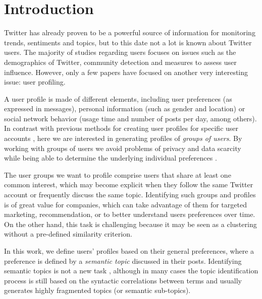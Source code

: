 \section{Introduction}

Twitter has already proven to be a powerful source of information for  monitoring
trends, sentiments and topics, 
but to
this date not a lot is known about Twitter users.  The majority of studies
regarding users focuses on issues such as the demographics of Twitter, 
community detection %
and measures to assess user influence.  However, only a 
few papers have focused on another very interesting issue: user profiling\cite{abel:2011}. 

A user profile is made of different elements, including user
preferences (as expressed in messages), personal information (such as gender and
location) or social network behavior (usage time and number of posts per day,
among others).  In contrast with previous methods for creating user profiles for
specific user accounts \cite{pennacchiotti2011democrats,abel2011semantic}, here
we are interested in generating profiles of \textit{groups of users}. By
working with groups of users we avoid problems of privacy and data scarcity
while being able to determine the underlying individual preferences \cite{zheleva:2009}. 

The user groups we want to profile comprise users that share at least one
common interest, which may become explicit when they follow the same Twitter
account or frequently discuss the same topic.  Identifying such groups and
profiles is of great value for companies, which can take advantage of them for
targeted marketing, recommendation, or to better understand
users preferences over time. On the other hand, this task is challenging because it may be seen as a clustering without a pre-defined similarity criterion.



In this work, we define users' profiles based on their general preferences,
where a preference is defined by a \textit{semantic topic} discussed in their
posts. Identifying semantic topics is not a new task
\cite{pons2007topic}, although in many cases the
topic identification process is still based on the syntactic correlations
between terms and usually generates highly fragmented topics (or semantic
sub-topics). 

